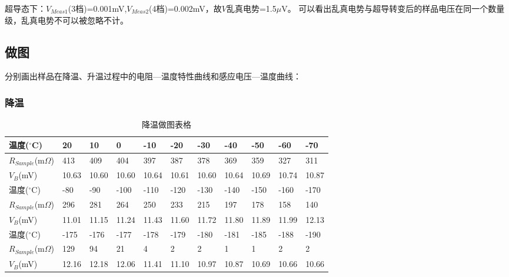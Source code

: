 \documentclass[UTF8]{ctexart}
\begin{document}
    超导态下：$V_{Meas1}$(3档)=0.001mV,$V_{Meas2}$(4档)=0.002mV，故$V$乱真电势=1.5$\mu$V。
    可以看出乱真电势与超导转变后的样品电压在同一个数量级，乱真电势不可以被忽略不计。

    \subsection{做图}

    分别画出样品在降温、升温过程中的电阻—温度特性曲线和感应电压—温度曲线：

    \subsubsection{降温}

    \begin{table}[H]
        \centering
        \begin{tabular}{|l|l|l|l|l|l|l|l|l|l|l|}
        \hline
            温度($^{\circ}$C) & 20 & 10 & 0 & -10 & -20 & -30 & -40 & -50 & -60 & -70 \\ \hline
            $R_{Sample}$(m$\Omega$) & 413 & 409 & 404 & 397 & 387 & 378 & 369 & 359 & 327 & 311 \\ \hline
            $V_B$(mV) & 10.63 & 10.60 & 10.60 & 10.64 & 10.61 & 10.60 & 10.64 & 10.69 & 10.74 & 10.87 \\ \hline
            \hline
            温度($^{\circ}$C) & -80 & -90 & -100 & -110 & -120 & -130 & -140 & -150 & -160 & -170 \\ \hline
            $R_{Sample}$(m$\Omega$) & 296 & 281 & 264 & 250 & 233 & 215 & 197 & 178 & 158 & 140 \\ \hline
            $V_B$(mV) & 11.01 & 11.15 & 11.24 & 11.43 & 11.60 & 11.72 & 11.80 & 11.89 & 11.99 & 12.13 \\ \hline
            \hline
            温度($^{\circ}$C) & -175 & -176 & -177 & -178 & -179 & -180 & -181 & -185 & -188 & -190 \\ \hline
            $R_{Sample}$(m$\Omega$) & 129 & 94 & 21 & 4 & 2 & 2 & 1 & 1 & 2 & 2 \\ \hline
            $V_B$(mV) & 12.16 & 12.18 & 12.06 & 11.41 & 11.10 & 10.97 & 10.87 & 10.69 & 10.66 & 10.66 \\ \hline
        \end{tabular}
        \caption{降温做图表格} %
        \label{降温做图表格} %
    \end{table}
\end{document}
